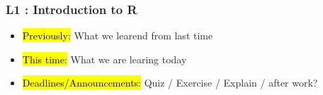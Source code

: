 
\begin{frame}
    \frametitle{L1 : Introduction to R }
    \begin{itemize}
        \item \hl{Previously: } What we learend from last time
        \item \hl{This time: } What we are learing today
        \item \hl{Deadlines/Announcements: } Quiz / Exercise / Explain / after work?
    \end{itemize}
    
    \end{frame}
    